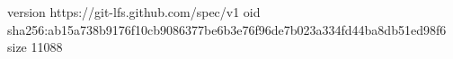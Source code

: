 version https://git-lfs.github.com/spec/v1
oid sha256:ab15a738b9176f10cb9086377be6b3e76f96de7b023a334fd44ba8db51ed98f6
size 11088
